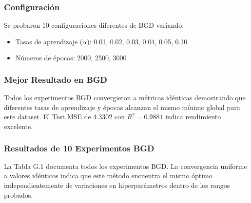 \documentclass[conference]{IEEEtran}
\begin{document}
\subsubsection{Configuración}

Se probaron 10 configuraciones diferentes de BGD variando:
\begin{itemize}
\item Tasas de aprendizaje ($\alpha$): 0.01, 0.02, 0.03, 0.04, 0.05, 0.10
\item Números de épocas: 2000, 2500, 3000
\end{itemize}

\subsubsection{Mejor Resultado en BGD}

Todos los experimentos BGD convergieron a métricas idénticas demostrando que diferentes tasas de aprendizaje y épocas alcanzan el mismo mínimo global para este dataset. El Test MSE de 4.3302 con $R^2 = 0.9881$ indica rendimiento excelente.

\subsubsection{Resultados de 10 Experimentos BGD}

La Tabla G.1 documenta todos los experimentos BGD. La convergencia uniforme a valores idénticos indica que este método encuentra el mismo óptimo independientemente de variaciones en hiperparámetros dentro de los rangos probados.

\begin{table}[h]
\centering
{}
\caption{Tabla G.1: Resultados de 10 Experimentos de BGD}
\label{tab:bgd_experiments}
\end{table}
\end{document}
